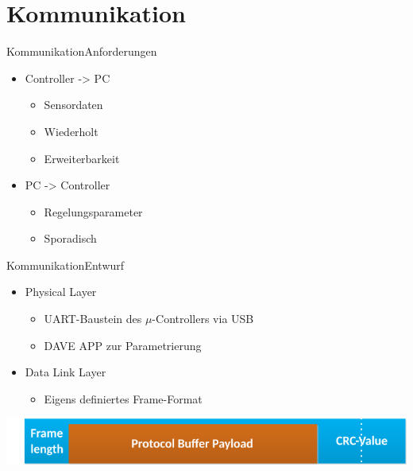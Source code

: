   \author{Michael Schleinkofer}
\section{Kommunikation}
\begin{frame}{Kommunikation}{Anforderungen}
  \begin{itemize}
    \item Controller -> PC
    \begin{itemize}
    \item Sensordaten
    \item Wiederholt
    \item Erweiterbarkeit
    \end{itemize}
    \item PC -> Controller
    \begin{itemize}
      \item Regelungsparameter
      \item Sporadisch
    \end{itemize}
  \end{itemize}
\end{frame}
\begin{frame}{Kommunikation}{Entwurf}
  \begin{itemize}
    \item Physical Layer
    \begin{itemize}
      \item UART-Baustein des $\mu$-Controllers via USB
      \item DAVE APP zur Parametrierung
    \end{itemize}
    \item Data Link Layer
    \begin{itemize}
      \item Eigens definiertes Frame-Format
    \end{itemize}
  \end{itemize}
  \begin{center}
    \includegraphics[width=\textwidth]{../communication/MessageFormat}
  \end{center}
\end{frame}
